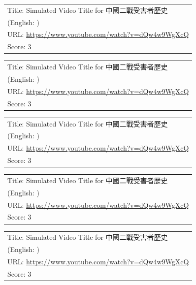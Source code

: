 \documentclass{article}
\begin{document}
\noindent
\begin{tabular}{p{}}
Title: Simulated Video Title for 中國二戰受害者歷史 \\
(English: ) \\
URL: \url{https://www.youtube.com/watch?v=dQw4w9WgXcQ} \\
Score: 3 \\
\end{tabular}
\vspace{0.5em}

\noindent
\begin{tabular}{p{}}
Title: Simulated Video Title for 中國二戰受害者歷史 \\
(English: ) \\
URL: \url{https://www.youtube.com/watch?v=dQw4w9WgXcQ} \\
Score: 3 \\
\end{tabular}
\vspace{0.5em}

\noindent
\begin{tabular}{p{}}
Title: Simulated Video Title for 中國二戰受害者歷史 \\
(English: ) \\
URL: \url{https://www.youtube.com/watch?v=dQw4w9WgXcQ} \\
Score: 3 \\
\end{tabular}
\vspace{0.5em}

\noindent
\begin{tabular}{p{}}
Title: Simulated Video Title for 中國二戰受害者歷史 \\
(English: ) \\
URL: \url{https://www.youtube.com/watch?v=dQw4w9WgXcQ} \\
Score: 3 \\
\end{tabular}
\vspace{0.5em}

\noindent
\begin{tabular}{p{}}
Title: Simulated Video Title for 中國二戰受害者歷史 \\
(English: ) \\
URL: \url{https://www.youtube.com/watch?v=dQw4w9WgXcQ} \\
Score: 3 \\
\end{tabular}
\vspace{0.5em}
\end{document}
